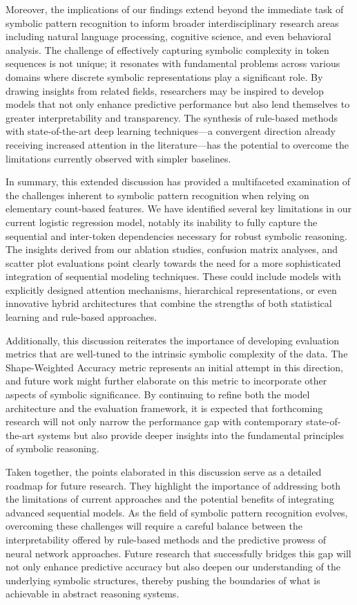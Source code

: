 \documentclass{article}
\begin{document}
Moreover, the implications of our findings extend beyond the immediate task of symbolic pattern recognition to inform broader interdisciplinary research areas including natural language processing, cognitive science, and even behavioral analysis. The challenge of effectively capturing symbolic complexity in token sequences is not unique; it resonates with fundamental problems across various domains where discrete symbolic representations play a significant role. By drawing insights from related fields, researchers may be inspired to develop models that not only enhance predictive performance but also lend themselves to greater interpretability and transparency. The synthesis of rule-based methods with state-of-the-art deep learning techniques—a convergent direction already receiving increased attention in the literature—has the potential to overcome the limitations currently observed with simpler baselines.

In summary, this extended discussion has provided a multifaceted examination of the challenges inherent to symbolic pattern recognition when relying on elementary count-based features. We have identified several key limitations in our current logistic regression model, notably its inability to fully capture the sequential and inter-token dependencies necessary for robust symbolic reasoning. The insights derived from our ablation studies, confusion matrix analyses, and scatter plot evaluations point clearly towards the need for a more sophisticated integration of sequential modeling techniques. These could include models with explicitly designed attention mechanisms, hierarchical representations, or even innovative hybrid architectures that combine the strengths of both statistical learning and rule-based approaches.

Additionally, this discussion reiterates the importance of developing evaluation metrics that are well-tuned to the intrinsic symbolic complexity of the data. The Shape-Weighted Accuracy metric represents an initial attempt in this direction, and future work might further elaborate on this metric to incorporate other aspects of symbolic significance. By continuing to refine both the model architecture and the evaluation framework, it is expected that forthcoming research will not only narrow the performance gap with contemporary state-of-the-art systems but also provide deeper insights into the fundamental principles of symbolic reasoning.

Taken together, the points elaborated in this discussion serve as a detailed roadmap for future research. They highlight the importance of addressing both the limitations of current approaches and the potential benefits of integrating advanced sequential models. As the field of symbolic pattern recognition evolves, overcoming these challenges will require a careful balance between the interpretability offered by rule-based methods and the predictive prowess of neural network approaches. Future research that successfully bridges this gap will not only enhance predictive accuracy but also deepen our understanding of the underlying symbolic structures, thereby pushing the boundaries of what is achievable in abstract reasoning systems.
\end{document}
